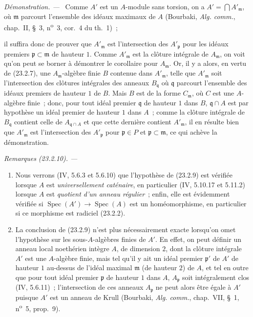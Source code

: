 \documentclass[10pt,oneside]{book}
\makeatletter
\newcommand{\setmanualcurrentlabel}[1]{\def\@currentlabel{#1}}
\newcommand{\oldpage}[2][]{%
  \setcounter{footnote}{0}%
  \marginpar{\scriptsize\textbf{#1}~|~#2}\ignorespaces}
\newenvironment{remarks}[1][]{%
  \setmanualcurrentlabel{#1}\par\medskip\noindent\itshape Remarques (#1). ---\ }{\par}
\newenvironment{proof}{%
  \par\medskip\noindent\textit{Démonstration. ---\ }}{\par}
\makeatother
\begin{document}
\begin{proof}
Comme $A'$ est un $A$-module sans torsion, on a
$A'=\bigcap A'_{\mathfrak m}$, où $\mathfrak m$ parcourt l'ensemble des idéaux
maximaux de $A$ (Bourbaki, \emph{Alg. comm.}, chap.~II, §~3,
n\textsuperscript{o}~3, cor.~4 du th.~1)~;

\oldpage[0\textsubscript{IV-1}]{221}

il suffira donc de prouver que $A'_{\mathfrak m}$ est l'intersection des
$A'_{\mathfrak p}$ pour les idéaux premiers $\mathfrak p\subset\mathfrak m$
de hauteur $1$. Comme $A'_{\mathfrak m}$ est la clôture intégrale de
$A_{\mathfrak m}$, on voit qu'on peut se borner à démontrer le corollaire pour
$A_{\mathfrak m}$. Or, il y a alors, en vertu de (23.2.7), une
$A_{\mathfrak m}$-algèbre finie $B$ contenue dans $A'_{\mathfrak m}$, telle
que $A'_{\mathfrak m}$ soit l'intersection des clôtures intégrales des anneaux
$B_{\mathfrak q}$ où $\mathfrak q$ parcourt l'ensemble des idéaux premiers de
hauteur $1$ de $B$. Mais $B$ est de la forme $C_{\mathfrak m}$, où $C$ est
une $A$-algèbre finie~; donc, pour tout idéal premier $\mathfrak q$ de hauteur
$1$ dans $B$, $\mathfrak q\cap A$ est par hypothèse un idéal premier de
hauteur $1$ dans $A$~; comme la clôture intégrale de $B_{\mathfrak q}$
contient celle de $A_{\mathfrak q\cap A}$ et que cette dernière contient
$A'_{\mathfrak m}$, il en résulte bien que $A'_{\mathfrak m}$ est
l'intersection des $A'_{\mathfrak p}$ pour $\mathfrak p\in P$ et
$\mathfrak p\subset\mathfrak m$, ce qui achève la démonstration.
\end{proof}

\begin{remarks}[23.2.10]
\label{0.23.2.10-fr}
\begin{enumerate}
  \item[(i)] Nous verrons (IV, 5.6.3 et 5.6.10) que l'hypothèse de (23.2.9)
  est vérifiée lorsque $A$ est \emph{universellement caténaire}, en particulier
  (IV, 5.10.17 et 5.11.2) lorsque $A$ est \emph{quotient d'un anneau
  régulier}~; enfin, elle est évidemment vérifiée si
  $\operatorname{Spec}(A')\to\operatorname{Spec}(A)$ est un homéomorphisme,
  en particulier si ce morphisme est radiciel (23.2.2).

  \item[(ii)] La conclusion de (23.2.9) n'est plus nécessairement exacte
  lorsqu'on omet l'hypothèse sur les sous-$A$-algèbres finies de $A'$. En
  effet, on peut définir un anneau local noethérien intègre $A$, de dimension
  $2$, dont la clôture intégrale $A'$ est une $A$-algèbre finie, mais tel qu'il
  y ait un idéal premier $\mathfrak p'$ de $A'$ de hauteur $1$ au-dessus de
  l'idéal maximal $\mathfrak m$ (de hauteur $2$) de $A$, et tel en outre que
  pour tout idéal premier $\mathfrak p$ de hauteur $1$ dans $A$,
  $A_{\mathfrak p}$ soit intégralement clos (IV, 5.6.11)~; l'intersection de
  ces anneaux $A_{\mathfrak p}$ ne peut alors être égale à $A'$ puisque $A'$
  est un anneau de Krull (Bourbaki, \emph{Alg. comm.}, chap.~VII, §~1,
  n\textsuperscript{o}~5, prop.~9).
\end{enumerate}
\end{remarks}
\end{document}
